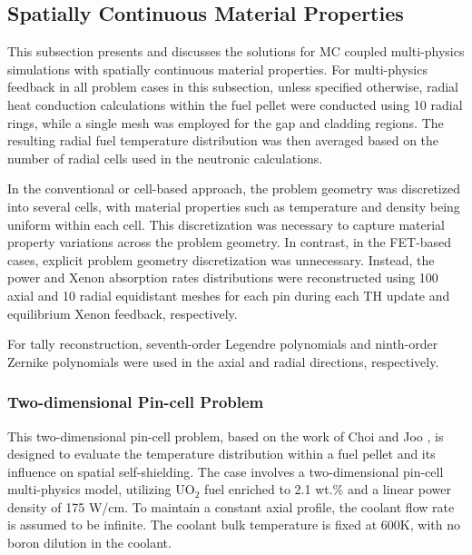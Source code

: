 \subsection{Spatially Continuous Material Properties} \label{sec41}

This subsection presents and discusses the solutions for MC coupled multi-physics simulations with spatially continuous material properties. For multi-physics feedback in all problem cases in this subsection, unless specified otherwise, radial heat conduction calculations within the fuel pellet were conducted using 10 radial rings, while a single mesh was employed for the gap and cladding regions. The resulting radial fuel temperature distribution was then averaged based on the number of radial cells used in the neutronic calculations.

In the conventional or cell-based approach, the problem geometry was discretized into several cells, with material properties such as temperature and density being uniform within each cell. This discretization was necessary to capture material property variations across the problem geometry. In contrast, in the FET-based cases, explicit problem geometry discretization was unnecessary. Instead, the power and Xenon absorption rates distributions were reconstructed using 100 axial and 10 radial equidistant meshes for each pin during each TH update and equilibrium Xenon feedback, respectively.

For tally reconstruction, seventh-order Legendre polynomials and ninth-order Zernike polynomials were used in the axial and radial directions, respectively.

\subsubsection{Two-dimensional Pin-cell Problem}

This two-dimensional pin-cell problem, based on the work of Choi and Joo \cite{nchoi_2020}, is designed to evaluate the temperature distribution within a fuel pellet and its influence on spatial self-shielding. The case involves a two-dimensional pin-cell multi-physics model, utilizing UO$_2$ fuel enriched to 2.1 wt.\% and a linear power density of 175 W/cm. To maintain a constant axial profile, the coolant flow rate is assumed to be infinite. The coolant bulk temperature is fixed at 600K, with no boron dilution in the coolant.

